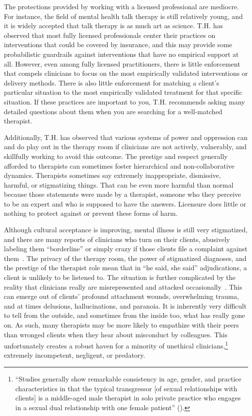 \documentclass[11pt,oneside]{book}
\let\cite\parencite
\begin{document}
The protections provided by working with a licensed professional are mediocre. For instance, the field of mental health talk therapy is still relatively young, and it is widely accepted that talk therapy is as much art as science. T.H. has observed that most fully licensed professionals center their practices on interventions that could be covered by insurance, and this may provide some probabilistic guardrails against interventions that have no empirical support at all. However, even among fully licensed practitioners, there is little enforcement that compels clinicians to focus on the most empirically validated interventions or delivery methods. There is also little enforcement for matching a client's particular situation to the most empirically validated treatment for that specific situation. If these practices are important to you, T.H. recommends asking many detailed questions about them when you are searching for a well-matched therapist.

Additionally, T.H. has observed that various systems of power and oppression can and do play out in the therapy room if clinicians are not actively, vulnerably, and skillfully working to avoid this outcome. The prestige and respect generally afforded to therapists can sometimes foster hierarchical and non-collaborative dynamics. Therapists sometimes say extremely inappropriate, dismissive, harmful, or stigmatizing things. That can be even more harmful than normal because those statements were made by a therapist, someone who they perceive to be an expert and who is supposed to have the answers. Licensure does little or nothing to protect against or prevent these forms of harm.

Although cultural acceptance is improving, mental illness is still very stigmatized, and there are many reports of clinicians who turn on their clients, abusively labeling them \enquote{borderline} or simply crazy if those clients file a complaint against them~\cite{hook2018boundary}. The privacy of the therapy room, the power of stigmatized diagnoses, and the prestige of the therapist role mean that in \enquote{he said, she said} adjudications, a client is unlikely to be listened to. The situation is further complicated by the reality that clinicians really are misrepresented and attacked occasionally~\cite{gutheil1991patients,williams2000victimized}. This can emerge out of clients' profound attachment wounds, overwhelming trauma, and at times delusions, hallucinations, and paranoia. It is inherently very difficult to tell from the outside, and sometimes from the inside too, what has really gone on. As such, many therapists may be more likely to empathize with their peers~\cite{hook2018boundary} than wronged clients when they hear about misconduct by colleagues. This unfortunately creates a robust haven for a minority of unethical clinicians,\footnote{\enquote{Studies generally show remarkable consistency in age, gender, and practice characteristics in that the typical transgressor [of sexual relationships with clients] is a middle-aged male therapist in solo private practice who engages in a sexual dual relationship with one female patient} (\textcite{sexViolations}).} extremely incompetent, negligent, or predatory.
\end{document}
